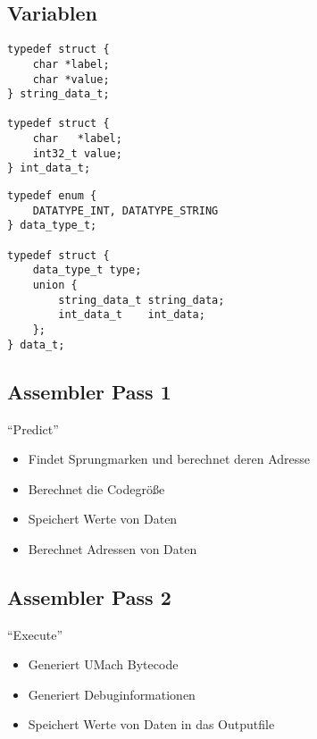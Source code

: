 \subsection{Variablen}

\begin{frame}[fragile]{\insertsubsection}
\begin{lstlisting}
typedef struct {
    char *label;
    char *value;
} string_data_t;

typedef struct {
    char   *label;
    int32_t value;
} int_data_t;
\end{lstlisting}
\end{frame}

\begin{frame}[fragile]{\insertsubsection}
\begin{lstlisting}
typedef enum {
    DATATYPE_INT, DATATYPE_STRING
} data_type_t;

typedef struct {
    data_type_t type;
    union {
        string_data_t string_data;
        int_data_t    int_data;
    };
} data_t;
\end{lstlisting}
\end{frame}

\subsection{Assembler Pass 1}

\begin{frame}{\insertsection}{\insertsubsection}
    ``Predict''
    \begin{itemize}
        \item Findet Sprungmarken und berechnet deren Adresse
        \item Berechnet die Codegröße
        \item Speichert Werte von Daten
        \item Berechnet Adressen von Daten
    \end{itemize}
\end{frame}

\subsection{Assembler Pass 2}

\begin{frame}{\insertsection}{\insertsubsection}
    ``Execute''
    \begin{itemize}
        \item Generiert UMach Bytecode
        \item Generiert Debuginformationen
        \item Speichert Werte von Daten in das Outputfile
    \end{itemize}
\end{frame}

